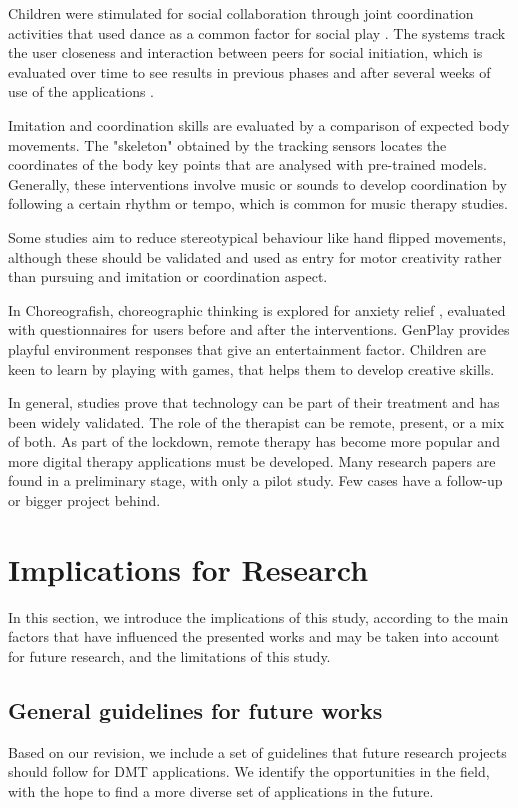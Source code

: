 \documentclass[a4paper,fleqn]{cas-sc}
\begin{document}
Children were stimulated for social collaboration through joint coordination activities that used dance as a common factor for social play \cite{Raygoza-Romero21, Osmosis20, Zampella21} . The systems track the user closeness and interaction between peers for social initiation, which is evaluated over time to see results in previous phases and after several weeks of use of the applications \cite{Osmosis20}.


Imitation and coordination skills are evaluated by a comparison of expected body movements. The "skeleton" obtained by the tracking sensors locates the coordinates of the body key points that are analysed with pre-trained models. Generally, these interventions involve music or sounds to develop coordination by following a certain rhythm or tempo, which is common for music therapy studies.

Some studies aim to reduce stereotypical behaviour like hand flipped movements, although these should be validated and used as entry for motor creativity rather than pursuing and imitation or coordination aspect.
 
In Choreografish, choreographic thinking is explored for anxiety relief \cite{AltizerJr18}, evaluated with questionnaires for users before and after the interventions. GenPlay provides playful environment responses \cite{Crowell18} that give an entertainment factor. Children are keen to learn by playing with games, that helps them to develop creative skills.

In general, studies prove that technology can be part of their treatment and has been widely validated. The role of the therapist can be remote, present, or a mix of both. As part of the lockdown, remote therapy has become more popular and more digital therapy applications must be developed.
Many research papers are found in a preliminary stage, with only a pilot study. Few cases have a follow-up or bigger project behind.


\section{Implications for Research}
\label{sec6:implications}
In this section, we introduce the implications of this study, according to the main factors that have influenced the presented works and may be taken into account for future research, and the limitations of this study.

\subsection{General guidelines for future works}
Based on our revision, we include a set of guidelines that future research projects should follow for DMT applications. We identify the opportunities in the field, with the hope to find a more diverse set of applications in the future.
\end{document}
